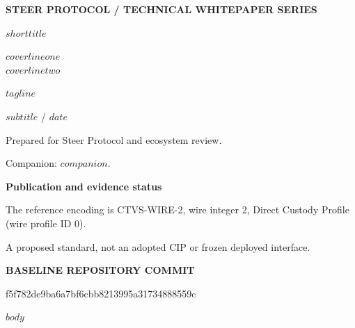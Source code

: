 \documentclass[11pt,letterpaper]{article}
\begin{document}
\begin{titlepage}
\thispagestyle{empty}
{\sffamily\small\bfseries\color{Muted}STEER PROTOCOL / TECHNICAL WHITEPAPER SERIES}\par
\vspace{0.55in}
{\sffamily\bfseries\fontsize{43}{48}\selectfont\color{Ink}$shorttitle$}\par
\vspace{0.16in}
{\sffamily\bfseries\fontsize{27}{33}\selectfont\color{Ink}\raggedright $coverlineone$\\$coverlinetwo$}\par
\vspace{0.20in}
{\large\color{Muted}$tagline$}\par
\vspace{0.40in}
{\sffamily $subtitle$ / $date$}\par
\vspace{0.17in}
Prepared for Steer Protocol and ecosystem review.\par
Companion: $companion$.\par
\vfill
\noindent\colorbox{Soft}{\parbox{\dimexpr\textwidth-2\fboxsep\relax}{\vspace{9pt}\hspace{8pt}\begin{minipage}{\dimexpr\textwidth-24pt\relax}
{\sffamily\bfseries\color{Ink}Publication and evidence status}\par
The reference encoding is CTVS-WIRE-2, wire integer 2, Direct Custody Profile (wire profile ID 0).\par
\end{minipage}\vspace{9pt}}}\par
\vspace{0.20in}
{\small A proposed standard, not an adopted CIP or frozen deployed interface.}\par
\vspace{0.12in}
{\sffamily\scriptsize\bfseries BASELINE REPOSITORY COMMIT}\par
{\ttfamily\small f5f782de9ba6a7bf6cbb8213995a31734888559c}\par
\end{titlepage}
\setcounter{page}{2}
$body$
\end{document}

